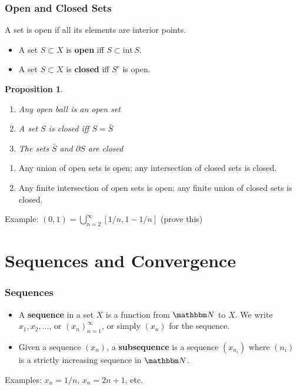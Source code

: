 \documentclass[9pt,aspectratio=169]{beamer}
\newcommand{\NN}{\mathbbm N}
\newcommand{\interior}{\text{int}\,}
\newtheorem{proposition}[theorem]{Proposition}
\begin{document}
\begin{frame}[allowframebreaks]
    \frametitle{Open and Closed Sets}
    A set is open if all its elements are interior points.
    \begin{definition}
        \begin{itemize}
            \item A set $S \subset X$ is \textbf{open} iff $S \subset \interior S$.
            \item A set $S \subset X$ is \textbf{closed} iff $S^c$ is open.
        \end{itemize}
    \end{definition}
        \begin{proposition}
        \begin{enumerate}
            \item Any open ball is an open set
            \item A set $S$ is closed iff $S = \bar S$
            \item The sets $\bar S$ and $\partial S$ are closed
        \end{enumerate}
    \end{proposition}
    \framebreak
    \begin{theorem}
        \begin{enumerate}
            \item Any union of open sets is open; any intersection of closed
            sets is closed.
            \item Any finite intersection of open sets is open; any finite
            union of closed sets is closed.
        \end{enumerate}
    \end{theorem}
    Example: $(0, 1) = \bigcup_{n=2}^\infty[1/n, 1 - 1/n]$ (prove this)
\end{frame}

\section{Sequences and Convergence}

\begin{frame}
    \frametitle{Sequences}
    \begin{definition}
        \begin{itemize}
            \item A \textbf{sequence} in a set $X$ is a function from $\NN$
            to $X$. We write $x_1, x_2, \ldots$, or $(x_n)_{n=1}^\infty$, or
            simply $(x_n)$ for the sequence.
            \item Given a sequence $(x_n)$, a \textbf{subsequence} is a
            sequence $(x_{n_i})$ where $(n_i)$ is a strictly increasing
            sequence in $\NN$.
        \end{itemize}        
    \end{definition}
    Examples: $x_n = 1/n$, $x_n = 2n + 1$, etc.
\end{frame}
\end{document}
